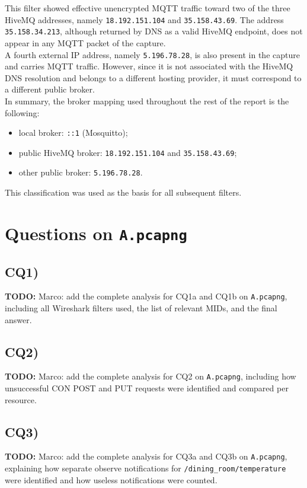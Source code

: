 \documentclass[a4paper,11pt]{article}
\newcommand{\TODO}[1]{
\begin{todobox}
\textbf{TODO:} #1
\end{todobox}
}
\begin{document}
This filter showed effective unencrypted MQTT traffic toward two of the three HiveMQ
addresses, namely \texttt{18.192.151.104} and \texttt{35.158.43.69}. The address
\texttt{35.158.34.213}, although returned by DNS as a valid HiveMQ endpoint, does not
appear in any MQTT packet of the capture.\\

A fourth external IP address, namely \texttt{5.196.78.28}, is also present in the
capture and carries MQTT traffic. However, since it is not associated with the HiveMQ
DNS resolution and belongs to a different hosting provider, it must correspond to a
different public broker.\\

In summary, the broker mapping used throughout the rest of the report is the
following:

\begin{itemize}
    \item local broker: \texttt{::1} (Mosquitto);
    \item public HiveMQ broker: \texttt{18.192.151.104} and \texttt{35.158.43.69};
    \item other public broker: \texttt{5.196.78.28}.
\end{itemize}

This classification was used as the basis for all subsequent filters.

\section{Questions on \texttt{A.pcapng}}

\subsection{CQ1)}
\TODO{Marco: add the complete analysis for CQ1a and CQ1b on \texttt{A.pcapng}, including all Wireshark filters used, the list of relevant MIDs, and the final answer.}

\subsection{CQ2)}
\TODO{Marco: add the complete analysis for CQ2 on \texttt{A.pcapng}, including how unsuccessful CON POST and PUT requests were identified and compared per resource.}

\subsection{CQ3)}
\TODO{Marco: add the complete analysis for CQ3a and CQ3b on \texttt{A.pcapng}, explaining how separate observe notifications for \texttt{/dining\_room/temperature} were identified and how useless notifications were counted.}
\end{document}
